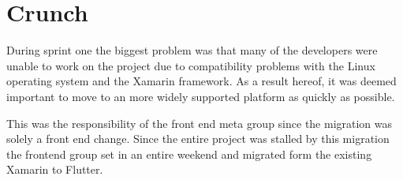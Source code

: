 \section{Crunch}
During sprint one the biggest problem was that many of the developers were unable to work on the project due to compatibility problems with the Linux operating system and the Xamarin framework. 
As a result hereof, it was deemed important to move to an more widely supported platform as quickly as possible. 

This was the responsibility of the front end meta group since the migration was solely a front end change. 
Since the entire project was stalled by this migration the frontend group set in an entire weekend and migrated form the existing Xamarin to Flutter.
